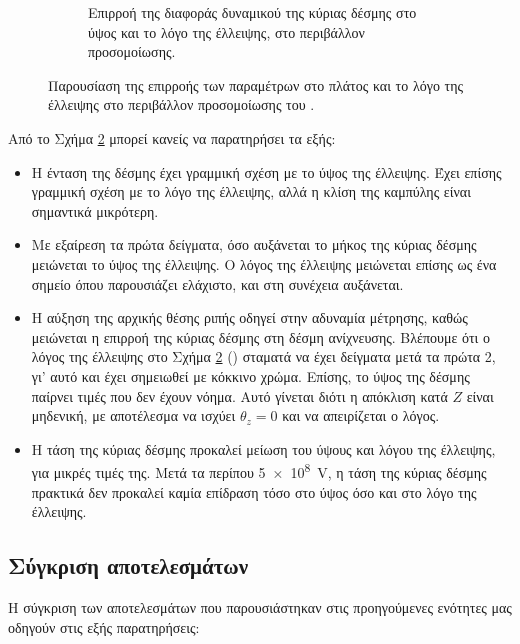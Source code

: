 \begin{figure}[tph]
\begin{subfigure}{0.47\textwidth}
		\centering
		\caption{Επιρροή της διαφοράς δυναμικού της κύριας δέσμης στο ύψος και το λόγο της έλλειψης, στο περιβάλλον προσομοίωσης.}
		\label{fig:CST-ellipse-height-ratio-by-voltage}
	\end{subfigure}
\caption[Όμοια με το Σχήμα \ref{fig:EBS-MATLAB-variables}, παρουσίαση της επιρροής των παραμέτρων στο πλάτος και το λόγο της έλλειψης στο περιβάλλον προσομοίωσης του  αυτή τη φορά.]
{Παρουσίαση της επιρροής των παραμέτρων στο πλάτος και το λόγο της έλλειψης στο περιβάλλον προσομοίωσης του .}
\label{fig:EBS-CST-variables}
\end{figure}


Από το Σχήμα \ref{fig:EBS-CST-variables} μπορεί κανείς να παρατηρήσει τα εξής:
\begin{itemize}
\item Η ένταση της δέσμης έχει γραμμική σχέση με το ύψος της έλλειψης. 
Έχει επίσης γραμμική σχέση με το λόγο της έλλειψης, αλλά η κλίση της καμπύλης είναι σημαντικά μικρότερη.
\item Με εξαίρεση τα πρώτα δείγματα, όσο αυξάνεται το μήκος της κύριας δέσμης μειώνεται το ύψος της έλλειψης.
Ο λόγος της έλλειψης μειώνεται επίσης ως ένα σημείο όπου παρουσιάζει ελάχιστο, και στη συνέχεια αυξάνεται.
\item Η αύξηση της αρχικής θέσης ριπής οδηγεί στην αδυναμία μέτρησης, καθώς μειώνεται η επιρροή της κύριας δέσμης στη δέσμη ανίχνευσης.
Βλέπουμε ότι ο λόγος της έλλειψης στο Σχήμα \ref{fig:EBS-CST-variables} () σταματά να έχει δείγματα μετά τα πρώτα 2, γι' αυτό και έχει σημειωθεί με κόκκινο χρώμα.
Επίσης, το ύψος της δέσμης παίρνει τιμές που δεν έχουν νόημα.
Αυτό γίνεται διότι η απόκλιση κατά $Z$ είναι μηδενική, με αποτέλεσμα να ισχύει $\theta_z = 0$ και να απειρίζεται ο λόγος.
\item Η τάση της κύριας δέσμης προκαλεί μείωση του ύψους και λόγου της έλλειψης, για μικρές τιμές της. 
Μετά τα περίπου \SI{5e8}{\volt}, η τάση της κύριας δέσμης πρακτικά δεν προκαλεί καμία επίδραση τόσο στο ύψος όσο και στο λόγο της έλλειψης.
\end{itemize}


\subsection{Σύγκριση αποτελεσμάτων}

Η σύγκριση των αποτελεσμάτων που παρουσιάστηκαν στις προηγούμενες ενότητες μας οδηγούν στις εξής παρατηρήσεις:


